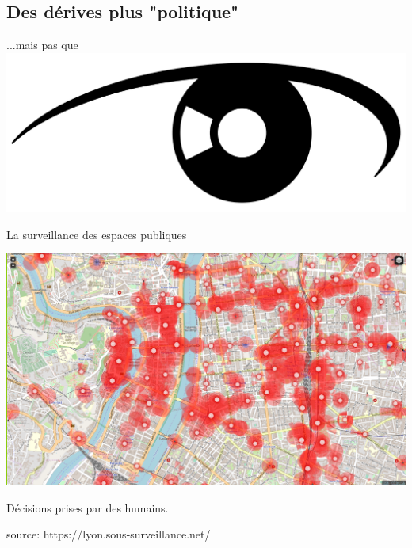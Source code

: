 \subsection{Des dérives plus "politique"}
\begin{frame}{\hfill ...mais pas que}
  \includegraphics[width=\textwidth]{usages/oeil.png}
\end{frame}

\begin{frame}{La surveillance des espaces publiques}

  \includegraphics[width=\textwidth]{usages/surveillance_lyon.png}

  Décisions prises par des humains.

  \footnotesize{\tiny{source: https://lyon.sous-surveillance.net/}}
\end{frame}


